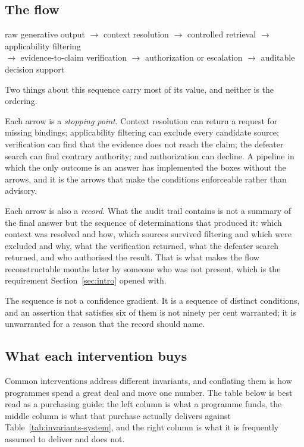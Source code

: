 \subsection{The flow}

\begin{center}
raw generative output
$\rightarrow$ context resolution
$\rightarrow$ controlled retrieval
$\rightarrow$ applicability filtering \\
$\rightarrow$ evidence-to-claim verification
$\rightarrow$ authorization or escalation
$\rightarrow$ auditable decision support
\end{center}

Two things about this sequence carry most of its value, and neither is the ordering.

Each arrow is a \emph{stopping point}. Context resolution can return a request for
missing bindings; applicability filtering can exclude every candidate source; verification
can find that the evidence does not reach the claim; the defeater search can find contrary
authority; and authorization can decline. A pipeline in which the only outcome is an
answer has implemented the boxes without the arrows, and it is the arrows that make the
conditions enforceable rather than advisory.

Each arrow is also a \emph{record}. What the audit trail contains is not a summary of the
final answer but the sequence of determinations that produced it: which context was
resolved and how, which sources survived filtering and which were excluded and why, what
the verification returned, what the defeater search returned, and who authorised the
result. That is what makes the flow reconstructable months later by someone who was not
present, which is the requirement Section~\ref{sec:intro} opened with.

The sequence is not a confidence gradient. It is a sequence of distinct conditions, and an
assertion that satisfies six of them is not ninety per cent warranted; it is unwarranted
for a reason that the record should name.

\subsection{What each intervention buys}

Common interventions address different invariants, and conflating them is how programmes
spend a great deal and move one number. The table below is best read as a purchasing
guide: the left column is what a programme funds, the middle column is what that
purchase actually delivers against Table~\ref{tab:invariants-system}, and the right
column is what it is frequently assumed to deliver and does not.

